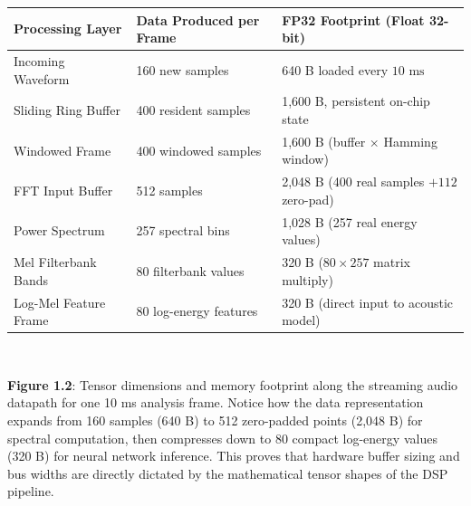 \documentclass[11pt,a4paper]{article}
\renewcommand{\thefigure}{1.2\alph{figure}}
\begin{document}
\begin{center}\vspace{-1mm}
\begin{minipage}{\textwidth}
\centering
\small
{}\label{tab:tensor_sizes}
\vspace{1mm}
\begin{tabular}{lll}
\toprule
\textbf{Processing Layer} & \textbf{Data Produced per Frame} & \textbf{FP32 Footprint (Float 32-bit)} \\
\midrule
Incoming Waveform & 160 new samples & 640 B loaded every $10\text{ ms}$ \\
Sliding Ring Buffer & 400 resident samples & 1,600 B, persistent on-chip state \\
Windowed Frame & 400 windowed samples & 1,600 B (buffer $\times$ Hamming window) \\
FFT Input Buffer & 512 samples & 2,048 B (400 real samples $+ 112$ zero-pad) \\
Power Spectrum & 257 spectral bins & 1,028 B (257 real energy values) \\
Mel Filterbank Bands & 80 filterbank values & 320 B ($80 \times 257$ matrix multiply) \\
Log-Mel Feature Frame & 80 log-energy features & 320 B (direct input to acoustic model) \\
\bottomrule
\end{tabular}
\end{minipage}
\end{center}

\begin{center}\vspace{-2mm}
\begin{minipage}{\textwidth}
\centering
\\[2mm]
\label{fig:1_2b_pipeline_tensor_sizes}
\begin{minipage}{0.95\textwidth}
\small\textbf{Figure \thefigure}: Tensor dimensions and memory footprint along the streaming audio datapath for one 10 ms analysis frame. Notice how the data representation expands from 160 samples (640 B) to 512 zero-padded points (2,048 B) for spectral computation, then compresses down to 80 compact log-energy values (320 B) for neural network inference. This proves that hardware buffer sizing and bus widths are directly dictated by the mathematical tensor shapes of the DSP pipeline.
\end{minipage}
\end{minipage}\vspace{-2mm}
\end{center}
\clearpage
\end{document}
